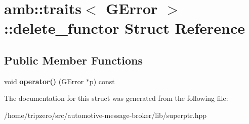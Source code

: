 \hypertarget{structamb_1_1traits_3_01GError_01_4_1_1delete__functor}{\section{amb\-:\-:traits$<$ G\-Error $>$\-:\-:delete\-\_\-functor Struct Reference}
\label{structamb_1_1traits_3_01GError_01_4_1_1delete__functor}
}
\subsection*{Public Member Functions}
\begin{DoxyCompactItemize}
\item 
\hypertarget{structamb_1_1traits_3_01GError_01_4_1_1delete__functor_ac39ebbfad72facba5348ae7ffcbda46f}{void {\bfseries operator()} (G\-Error $\ast$p) const }\label{structamb_1_1traits_3_01GError_01_4_1_1delete__functor_ac39ebbfad72facba5348ae7ffcbda46f}

\end{DoxyCompactItemize}


The documentation for this struct was generated from the following file\-:\begin{DoxyCompactItemize}
\item 
/home/tripzero/src/automotive-\/message-\/broker/lib/superptr.\-hpp\end{DoxyCompactItemize}
